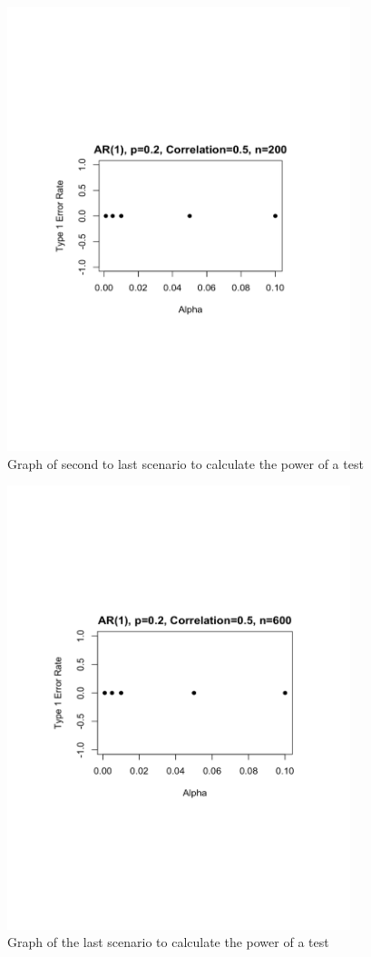 \documentclass[12pt, letterpaper]{article}
\begin{document}
\begin{figure}[!hb]
\centering
\includegraphics[width=10cm]{Powergraph3nonparam.pdf}
\caption{Graph of second to last scenario to calculate the power of a test}
\label{fig: Power Graphs 3}
\end{figure}

\begin{figure}[!hb]
\centering
\includegraphics[width=10cm]{Powergraph4nonparam.pdf}
\caption{Graph of the last scenario to calculate the power of a test}
\label{fig: Power Graphs 4}
\end{figure}
\end{document}
